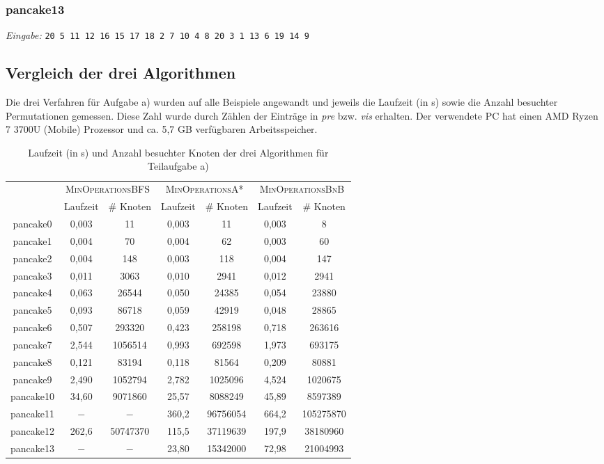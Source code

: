 \documentclass[a4paper, 10pt, ngerman]{article}
\begin{document}
\subsubsection{pancake13}
\scriptsize \emph{Eingabe: }\verb|20 5 11 12 16 15 17 18 2 7 10 4 8 20 3 1 13 6 19 14 9|
\normalsize


\subsection{Vergleich der drei Algorithmen}

Die drei Verfahren für Aufgabe a) wurden auf alle Beispiele angewandt und jeweils die Laufzeit (in s) sowie die Anzahl besuchter Permutationen gemessen. Diese Zahl wurde durch Zählen der Einträge in \emph{pre} bzw. \emph{vis} erhalten. Der verwendete PC hat einen AMD Ryzen 7 3700U (Mobile) Prozessor und ca. 5,7 GB verfügbaren Arbeitsspeicher.

\begin{table}[H]
    \centering
    \begin{tabular}{c c c c c c c}
        & \multicolumn{2}{c}{\textsc{MinOperationsBFS}} &
        \multicolumn{2}{c}{\textsc{MinOperationsA*}} &
        \multicolumn{2}{c}{\textsc{MinOperationsBnB}} \\
        & Laufzeit & \# Knoten & Laufzeit & \# Knoten & Laufzeit & \# Knoten \\
        \cmidrule{1-7}
        pancake0 & 0,003 & 11 & 0,003 & 11 & 0,003 & 8 \\
        pancake1 & 0,004 & 70 & 0,004 & 62 & 0,003 & 60  \\
        pancake2 & 0,004 & 148 & 0,003 & 118 & 0,004 & 147  \\
        pancake3 & 0,011 & 3063 & 0,010 & 2941 & 0,012 & 2941  \\
        pancake4 & 0,063 & 26544 & 0,050 & 24385 & 0,054 & 23880 \\
        pancake5 & 0,093 & 86718 & 0,059 & 42919 & 0,048 & 28865 \\
        pancake6 & 0,507 & 293320 & 0,423 & 258198 & 0,718 & 263616 \\
        pancake7 & 2,544 & 1056514 & 0,993 & 692598 & 1,973 & 693175 \\
        pancake8 & 0,121 & 83194 & 0,118 & 81564 & 0,209 & 80881 \\
        pancake9 & 2,490 & 1052794 & 2,782 & 1025096 & 4,524 & 1020675 \\
        pancake10 & 34,60 & 9071860 & 25,57 & 8088249 & 45,89 & 8597389 \\
        pancake11 & $-$ & $-$ & 360,2 & 96756054 & 664,2 & 105275870 \\
        pancake12 & 262,6 & 50747370 & 115,5 & 37119639 & 197,9 & 38180960 \\
        pancake13 & $-$ & $-$ & 23,80 & 15342000 & 72,98 & 21004993 \\
    \end{tabular}
    \caption{Laufzeit (in s) und Anzahl besuchter Knoten der drei Algorithmen für Teilaufgabe a)}
\end{table}
\end{document}
